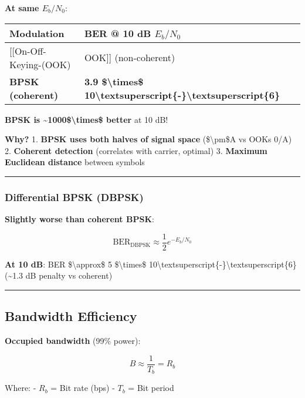 \textbf{At same \(E_b/N_0\)}:

{\def\LTcaptype{} %
\begin{longtable}[]{@{}ll@{}}
\toprule\noalign{}
Modulation & BER @ 10 dB \(E_b/N_0\) \\
\midrule\noalign{}
\endhead
\bottomrule\noalign{}
\endlastfoot
{[}{[}On-Off-Keying-(OOK) & OOK{]}{]} (non-coherent) \\
\textbf{BPSK (coherent)} & \textbf{3.9 \$\textbackslash times\$
10\textbackslash textsuperscript\{-\}\textbackslash textsuperscript\{6\}} \\
\end{longtable}
}

\textbf{BPSK is \textasciitilde1000\$\textbackslash times\$ better} at
10 dB!

\textbf{Why?} 1. \textbf{BPSK uses both halves of signal space}
(\$\textbackslash pm\$A vs OOK\textquotesingle s 0/A) 2.
\textbf{Coherent detection} (correlates with carrier, optimal) 3.
\textbf{Maximum Euclidean distance} between symbols

\begin{center}\rule{0.5\linewidth}{0.5pt}\end{center}

\subsubsection{Differential BPSK
(DBPSK)}\label{differential-bpsk-dbpsk-1}

\textbf{Slightly worse than coherent BPSK}:

\[
\text{BER}_{\text{DBPSK}} \approx \frac{1}{2}e^{-E_b/N_0}
\]

\textbf{At 10 dB}: BER \$\textbackslash approx\$ 5
\$\textbackslash times\$
10\textbackslash textsuperscript\{-\}\textbackslash textsuperscript\{6\}
(\textasciitilde1.3 dB penalty vs coherent)

\begin{center}\rule{0.5\linewidth}{0.5pt}\end{center}

\subsection{Bandwidth Efficiency}\label{bandwidth-efficiency}

\textbf{Occupied bandwidth} (99\% power):

\[
B \approx \frac{1}{T_b} = R_b
\]

Where: - \(R_b\) = Bit rate (bps) - \(T_b\) = Bit period

